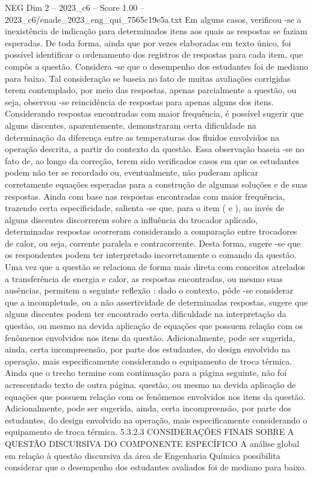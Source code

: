 \begin{textsample}{NEG Dim 2 – 2023\_c6 – Score 1.00 – 2023\_c6/enade\_2023\_eng\_qui\_7565c19e5a.txt}
Em alguns casos, verificou -se a inexistência de indicação para determinados itens aos quais as respostas se faziam esperadas.
De toda forma, ainda que por vezes elaboradas em texto único, foi possível identificar o ordenamento dos registros de respostas para cada item, que compôs a questão.
Considera -se que o desempenho dos estudantes foi de mediano para baixo.
Tal consideração se baseia no fato de muitas avaliações corrigidas terem contemplado, por meio das respostas, apenas parcialmente a questão, ou seja, observou -se reincidência de respostas para apenas alguns dos itens.
Considerando respostas encontradas com maior frequência, é possível sugerir que alguns discentes, aparentemente, demonstraram certa dificuldade na determinação da diferença entre as temperaturas dos fluidos envolvidos na operação descrita, a partir do contexto da questão.
Essa observação baseia -se no fato de, ao longo da correção, terem sido verificados casos em que os estudantes podem não ter se recordado ou, eventualmente, não puderam aplicar corretamente equações esperadas para a construção de algumas soluções e de suas respostas.
Ainda com base nas respostas encontradas com maior frequência, trazendo certa especificidade, salienta -se que, para o item ( e ), ao invés de alguns discentes discorrerem sobre a influência do trocador aplicado, determinadas respostas ocorreram considerando a comparação entre trocadores de calor, ou seja, corrente paralela e contracorrente.
Desta forma, sugere -se que os respondentes podem ter interpretado incorretamente o comando da questão.
Uma vez que a questão se relaciona de forma mais direta com conceitos atrelados a transferência de energia e calor, as respostas encontradas, ou mesmo suas ausências, permitem a seguinte reflexão : dado o contexto, pôde -se considerar que a incompletude, ou a não assertividade de determinadas respostas, sugere que alguns discentes podem ter encontrado certa dificuldade na interpretação da questão, ou mesmo na devida aplicação de equações que possuem relação com os fenômenos envolvidos nos itens da questão.
Adicionalmente, pode ser sugerida, ainda, certa incompreensão, por parte dos estudantes, do design envolvido na operação, mais especificamente considerando o equipamento de troca térmica.
Ainda que o trecho termine com continuação para a página seguinte, não foi acrescentado texto de outra página. questão, ou mesmo na devida aplicação de equações que possuem relação com os fenômenos envolvidos nos itens da questão.
Adicionalmente, pode ser sugerida, ainda, certa incompreensão, por parte dos estudantes, do design envolvido na operação, mais especificamente considerando o equipamento de troca térmica. 5.3.2.3 CONSIDERAÇÕES FINAIS SOBRE A QUESTÃO DISCURSIVA DO COMPONENTE ESPECÍFICO A análise global em relação à questão discursiva da área de Engenharia Química possibilita considerar que o desempenho dos estudantes avaliados foi de mediano para baixo.

\end{textsample}
